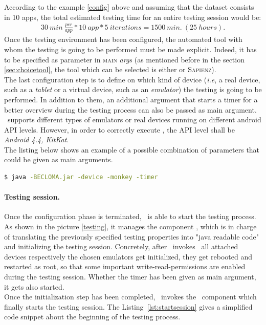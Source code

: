 According to the example \ref{config} above and assuming that the dataset consists in 10 apps, the total estimated testing time for an entire testing session would be: 
\begin{align*}
30 \:min \: \frac{per}{app} * 10\: app * 5\: iterations = 1500 \:min. \:(25\: hours). 
\end{align*}
Once the testing environment has been configured, the automated tool with whom the testing is going to be performed must be made explicit. 
Indeed, it has to be specified as parameter in \textsc{main} \textit{args} (as mentioned before in the section \ref{sec:choicetool}, the tool which can be selected is either \monkey or \textsc{Sapienz}).\\
The last configuration step is to define on which kind of device (\textit{i.e}, a real device, such as a \textit{tablet} or a virtual device, such as an \textit{emulator}) the testing is going to be performed. In addition to them, an additional argument that starts a timer for a better overview during the testing process can also be passed as main argument. \toolname\ supports different types of emulators or real devices running on different android API levels. However, in order to correctly execute \sapienz, the API level shall be \textit{Android 4.4, KitKat}. \\
The listing below shows an example of a possible combination of parameters that could be given as main arguments. 


\begin{lstlisting}[caption=\toolname\ command line, language=bash]
$ java -BECLOMA.jar -device -monkey -timer
\end{lstlisting}

\paragraph{Testing session.} Once the configuration phase is terminated, \toolname\ is able to start the testing process. 
As shown in the picture \ref{testing}, it manages the component \SessionLauncher, which is in charge of translating the previously specified testing properties into "java readable code" and initializing the testing session. 
Concretely, after \toolname\ invokes \SessionLauncher\ all attached devices respectively the chosen emulators get initialized, \ie they get rebooted and restarted as root, so that some important write-read-permissions are enabled during the testing session. 
Whether the timer has been given as main argument, it gets also started. \\
Once the initialization step has been completed, \SessionLauncher\  invokes the \AppTester\ component which finally starts the testing session. The Listing~\ref{lst:startsession} gives a simplified code snippet about the beginning of the testing process. 

